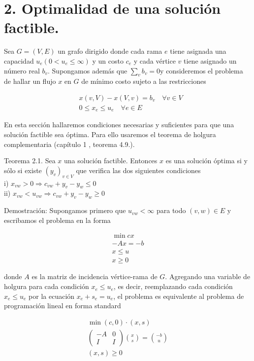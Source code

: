 \documentclass[10pt]{article}
\begin{document}
\section*{2. Optimalidad de una solución factible.}
Sea $G=(V, E)$ un grafo dirigido donde cada rama $e$ tiene asignada una capacidad $u_{e}\left(0<u_{e} \leq \infty\right)$ y un costo $c_{e}$ y cada vértice $v$ tiene asignado un número real $b_{v}$. Supongamos además que $\sum_{v} b_{v}=0 \mathrm{y}$ consideremos el problema de hallar un flujo $x$ en $G$ de mínimo costo sujeto a las restricciones

$$
\begin{aligned}
& x(v, V)-x(V, v)=b_{v} \quad \forall v \in V \\
& 0 \leq x_{e} \leq u_{e} \quad \forall e \in E
\end{aligned}
$$

En esta sección hallaremos condiciones necesarias y suficientes para que una solución factible sea óptima. Para ello usaremos el teorema de holgura complementaria (capítulo 1 , teorema 4.9.).

Teorema 2.1. Sea $x$ una solución factible. Entonces $x$ es una solución óptima si y sólo si existe $\left(y_{v}\right)_{v \in V}$ que verifica las dos siguientes condiciones\\
i) $x_{v w}>0 \Longrightarrow c_{v w}+y_{v}-y_{w} \leq 0$\\
ii) $x_{v w}<u_{v w} \Longrightarrow c_{v w}+y_{v}-y_{w} \geq 0$

Demostración: Supongamos primero que $u_{v w}<\infty$ para todo $(v, w) \in E$ y escribamos el problema en la forma


\begin{gather*}
\min c x \\
-A x=-b \\
x \leq u  \tag{1}\\
x \geq 0
\end{gather*}


donde $A$ es la matriz de incidencia vértice-rama de $G$. Agregando una variable de holgura para cada condición $x_{e} \leq u_{e}$, es decir, reemplazando cada condición $x_{e} \leq u_{e}$ por la ecuación $x_{e}+s_{e}=u_{e}$, el problema es equivalente al problema de programación lineal en forma standard


\begin{gather*}
\min (c, 0) \cdot(x, s) \\
\left(\begin{array}{cc}
-A & 0 \\
I & I
\end{array}\right)\binom{x}{s}=\binom{-b}{u}  \tag{P}\\
(x, s) \geq 0
\end{gather*}
\end{document}

